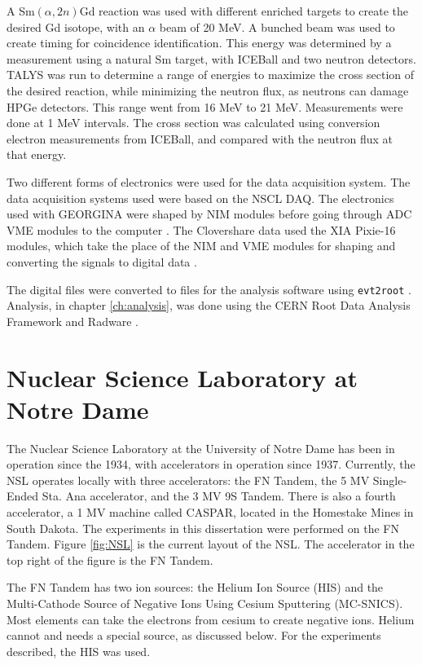 A Sm$(\alpha,2n)$Gd reaction was used with different enriched targets to create the desired Gd isotope, with an $\alpha$ beam of 20 MeV. A bunched beam was used to create timing for coincidence identification. This energy was determined by a measurement using a natural Sm target, with ICEBall and two neutron detectors. TALYS was run to determine a range of energies to maximize the cross section of the desired reaction, while minimizing the neutron flux, as neutrons can damage HPGe detectors. This range went from 16 MeV to 21 MeV. Measurements were done at 1 MeV intervals. The cross section was calculated using conversion electron measurements from ICEBall, and compared with the neutron flux at that energy.

Two different forms of electronics were used for the data acquisition system. The data acquisition systems used were based on the NSCL DAQ\citep{nscl:_daq,prokop14:_nsclddas}. The electronics used with GEORGINA were shaped by NIM modules before going through ADC VME modules to the computer \citep{mesytec:_ADC,caen:_TDC}. The Clovershare data used the XIA Pixie-16 modules, which take the place of the NIM and VME modules for shaping and converting the signals to digital data \citep{xia:_pixie}.

The digital files were converted to files for the analysis software using \texttt{evt2root} \citep{smith14:_evt2root}. Analysis, in chapter \ref{ch:analysis}, was done using the CERN Root Data Analysis Framework and Radware \citep{brun97:_root,radford00:_radware}.

\section{Nuclear Science Laboratory at Notre Dame}

The Nuclear Science Laboratory at the University of Notre Dame has been in operation since the 1934, with accelerators in operation since 1937. Currently, the NSL operates locally with three accelerators: the FN Tandem, the 5 MV Single-Ended Sta. Ana accelerator, and the 3 MV 9S Tandem. There is also a fourth accelerator, a 1 MV machine called CASPAR, located in the Homestake Mines in South Dakota. The experiments in this dissertation were performed on the FN Tandem. Figure \ref{fig:NSL} is the current layout of the NSL. The accelerator in the top right of the figure is the FN Tandem.

The FN Tandem has two ion sources: the Helium Ion Source (HIS) and the Multi-Cathode Source of Negative Ions Using Cesium Sputtering (MC-SNICS). Most elements can take the electrons from cesium to create negative ions. Helium cannot and needs a special source, as discussed below. For the experiments described, the HIS was used.

